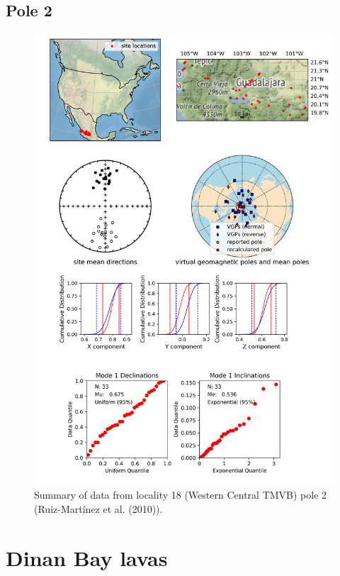 \subsection{Pole 2}


\begin{figure}[H]
\centering
\includegraphics[width=5 in]{./18/2/pole_summary.png}
\caption{Summary of data from locality 18 (Western Central TMVB) pole 2 (Ruiz-Martínez et al. (2010)).}
\end{figure}

\section{Dinan Bay lavas}
